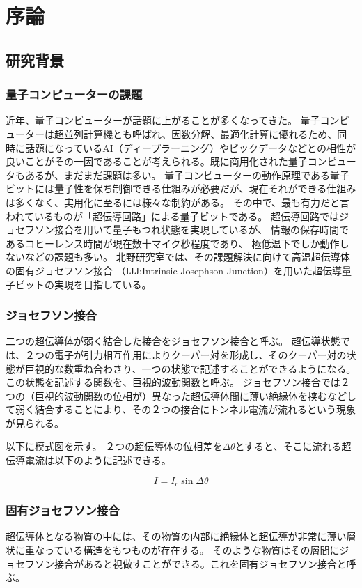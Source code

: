 \chapter{序論}


\section{研究背景}
\subsection{量子コンピューターの課題}
近年、量子コンピューターが話題に上がることが多くなってきた。
量子コンピューターは超並列計算機とも呼ばれ、因数分解、最適化計算に優れるため、同時に話題になっているAI（ディープラーニング）やビックデータなどとの相性が良いことがその一因であることが考えられる。既に商用化された量子コンピュータもあるが、まだまだ課題は多い。
量子コンピューターの動作原理である量子ビットには量子性を保ち制御できる仕組みが必要だが、現在それができる仕組みは多くなく、実用化に至るには様々な制約がある。
その中で、最も有力だと言われているものが「超伝導回路」による量子ビットである。
超伝導回路ではジョセフソン接合を用いて量子もつれ状態を実現しているが、
情報の保存時間であるコヒーレンス時間が現在数十マイク秒程度であり、
極低温下でしか動作しないなどの課題も多い。
北野研究室では、その課題解決に向けて高温超伝導体の固有ジョセフソン接合
（IJJ:Intrinsic Josephson Junction）を用いた超伝導量子ビットの実現を目指している。

\subsection{ジョセフソン接合}
二つの超伝導体が弱く結合した接合をジョセフソン接合と呼ぶ。
超伝導状態では、２つの電子が引力相互作用によりクーパー対を形成し、そのクーパー対の状態が巨視的な数重ね合わさり、一つの状態で記述することができるようになる。
この状態を記述する関数を、巨視的波動関数と呼ぶ。
ジョセフソン接合では２つの（巨視的波動関数の位相が）異なった超伝導体間に薄い絶縁体を挟むなどして弱く結合することにより、その２つの接合にトンネル電流が流れるという現象が見られる。

以下に模式図を示す。
２つの超伝導体の位相差を$ \Delta \theta $とすると、そこに流れる超伝導電流は以下のように記述できる。

\[ I = I_c \sin{\Delta \theta } \]

\subsection{固有ジョセフソン接合}
超伝導体となる物質の中には、その物質の内部に絶縁体と超伝導が非常に薄い層状に重なっている構造をもつものが存在する。
そのような物質はその層間にジョセフソン接合があると視做すことができる。これを固有ジョセフソン接合と呼ぶ。

